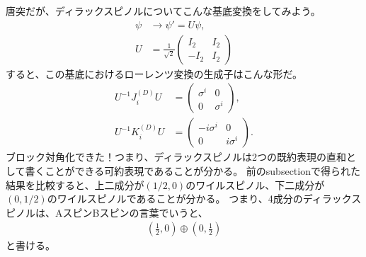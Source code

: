 \documentclass[10pt,a4paper]{jarticle}
\begin{document}
唐突だが、ディラックスピノルについてこんな基底変換をしてみよう。
\begin{align}
\psi &\to \psi' = U \psi, \\
U &= \frac{1}{\sqrt 2}\left(
\begin{array}{cc}
I_2 & I_2 \\
-I_2 & I_2
\end{array}
\right)
\end{align}
すると、この基底におけるローレンツ変換の生成子はこんな形だ。
\begin{align}
U^{-1} J_i^{(D)} U
&=
\left(
\begin{array}{cc}
\sigma^i & 0 \\
0 & \sigma^i
\end{array}
\right), \\
%
U^{-1} K_i^{(D)} U
&=
\left(
\begin{array}{cc}
-i\sigma^i & 0 \\
0 & i \sigma^i
\end{array}
\right).
\end{align}
ブロック対角化できた！つまり、ディラックスピノルは2つの既約表現の直和として書くことができる可約表現であることが分かる。
前のsubsectionで得られた結果を比較すると、上二成分が$(1/2,0)$のワイルスピノル、下二成分が$(0,1/2)$のワイルスピノルであることが分かる。
つまり、4成分のディラックスピノルは、AスピンBスピンの言葉でいうと、
\begin{align}
\left( \frac{1}{2}, 0 \right) \oplus \left( 0, \frac{1}{2} \right)
\end{align}
と書ける。
\end{document}
